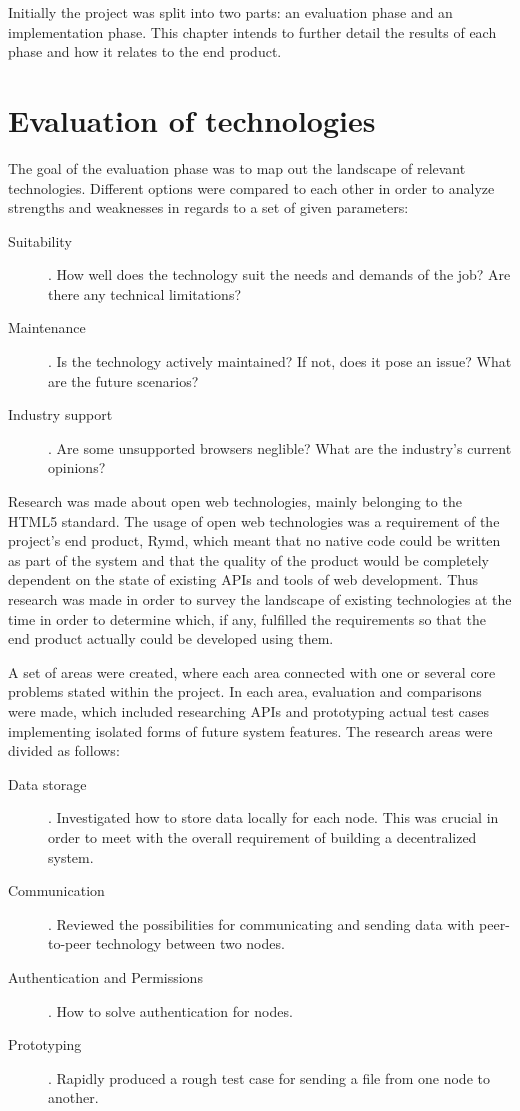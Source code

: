 Initially the project was split into two parts: an evaluation phase and an implementation phase. This chapter intends to further detail the results of each phase and how it relates to the end product.

\section{Evaluation of technologies}

The goal of the evaluation phase was to map out the landscape of relevant technologies. Different options were compared  to each other in order to analyze strengths and weaknesses in regards to a set of given parameters:

\begin{description}
  \item[Suitability]. How well does the technology suit the needs and demands of the job? Are there any technical limitations?
  \item[Maintenance]. Is the technology actively maintained? If not, does it pose an issue? What are the future scenarios?
  \item[Industry support]. Are some unsupported browsers neglible? What are the industry's current opinions?
\end{description}

Research was made about open web technologies, mainly belonging to the HTML5 standard. The usage of open web technologies was a requirement of the project's end product, Rymd, which meant that no native code could be written as part of the system and that the quality of the product would be completely dependent on the state of existing APIs and tools of web development. Thus research was made in order to survey the landscape of existing technologies at the time in order to determine which, if any, fulfilled the requirements so that the end product actually could be developed using them.

A set of areas were created, where each area connected with one or several core problems stated within the project. In each area, evaluation and comparisons were made, which included researching APIs and prototyping actual test cases implementing isolated forms of future system features. The research areas were divided as follows:

\begin{description}
\item[Data storage]. Investigated how to store data locally for each node. This was crucial in order to meet with the overall requirement of building a decentralized system.
\item[Communication]. Reviewed the possibilities for communicating and sending data with peer-to-peer technology between two nodes.
\item[Authentication and Permissions]. How to solve authentication for nodes.
\item[Prototyping]. Rapidly produced a rough test case for sending a file from one node to another.
\end{description}


